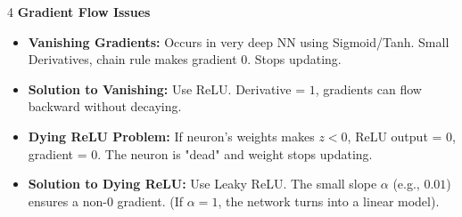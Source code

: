 \documentclass[8pt,landscape,a4paper]{extarticle}
\begin{document}
\begin{multicols*}{4}
\vspace{1mm}
\noindent\textbf{Gradient Flow Issues}
\begin{itemize}[leftmargin=*, nosep]
    \item \textbf{Vanishing Gradients:} Occurs in very deep NN using Sigmoid/Tanh. Small Derivatives, chain rule makes gradient 0. Stops updating.
    \item \textbf{Solution to Vanishing:} Use ReLU. Derivative = $1$, gradients can flow backward without decaying.
    \item \textbf{Dying ReLU Problem:} If neuron's weights makes $z < 0$, ReLU output = $0$, gradient = $0$. The neuron is "dead" and weight stops updating.
    \item \textbf{Solution to Dying ReLU:} Use Leaky ReLU. The small slope $\alpha$ (e.g., $0.01$) ensures a non-$0$ gradient. (If $\alpha = 1$, the network turns into a linear model).
\end{itemize}


\end{multicols*}
\end{document}
